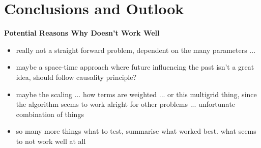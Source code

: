 \documentclass[../draft_1.tex]{subfiles}
\begin{document}
\chapter{Conclusions and Outlook}

\textbf{Potential Reasons Why Doesn't Work Well}



\begin{itemize}
	\item really not a straight forward problem, dependent on the many parameters ... 
	\item maybe a space-time approach where future influencing the past isn't a great idea, should follow causality principle? 
	\item maybe the scaling ... how terms are weighted ... or this multigrid thing, since the algorithm seems to work alright for other problems ... unfortunate combination of things
	\item so many more things what to test, summarise what worked best. what seems to not work well at all
	
\end{itemize}
\end{document}
